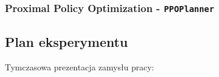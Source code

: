 \subsubsection{Proximal Policy Optimization - \texttt{PPOPlanner}}\label{section_experiment_models_RL}

\subsection{Plan eksperymentu}\label{section_experiment_plan}
Tymczasowa prezentacja zamysłu pracy:

